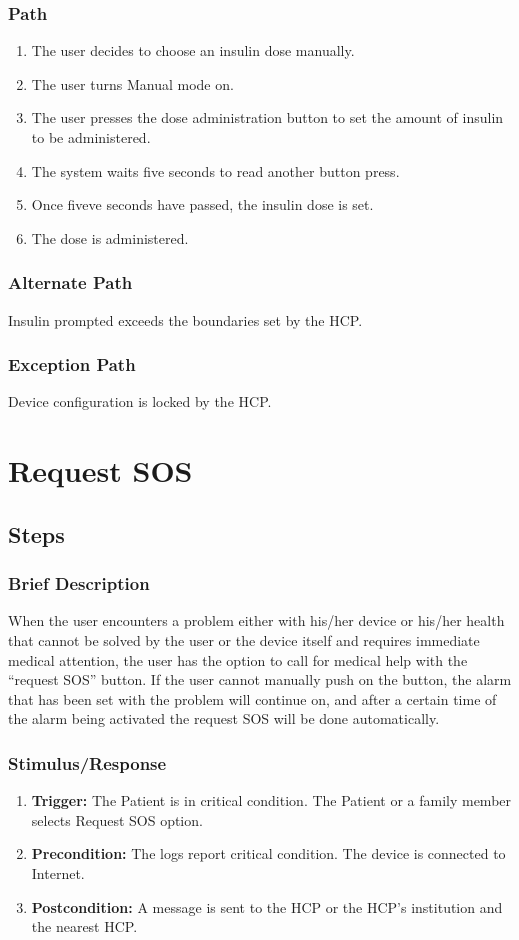 \documentclass{scrreprt}
\begin{document}
    \subsubsection{Path}
    \begin{enumerate}
        \item The user decides to choose an insulin dose manually.
        \item The user turns Manual mode on.
        \item The user presses the dose administration button to set the amount of insulin to be administered.
        \item The system waits five seconds to read another button press.
        \item Once fiveve seconds have passed, the insulin dose is set.
        \item The dose is administered.
    \end{enumerate}
    \subsubsection{Alternate Path}
        Insulin prompted exceeds the boundaries set by the HCP.  
    \subsubsection{Exception Path}
        Device configuration is locked by the HCP. 

\section{Request SOS}
\subsection{Steps}
    \subsubsection{Brief Description}
    When the user encounters a problem either with his/her device or his/her health that cannot be solved by the user or the device itself and requires immediate medical attention, the user has the option to call for 
    medical help with the “request SOS” button. If the user cannot manually push on the button, the alarm that has been set with the problem will continue on, and after a certain time of the alarm being activated the 
    request SOS will be done automatically.
    \subsubsection{Stimulus/Response}
    \begin{enumerate}
        \item \textbf{Trigger:} The Patient is in critical condition. The Patient or a family member selects Request SOS option.
        \item \textbf{Precondition:} The logs report critical condition. The device is connected to Internet. 
        \item \textbf{Postcondition:} A message is sent to the HCP or the HCP's institution and the nearest HCP. 
    \end{enumerate}
\end{document}
